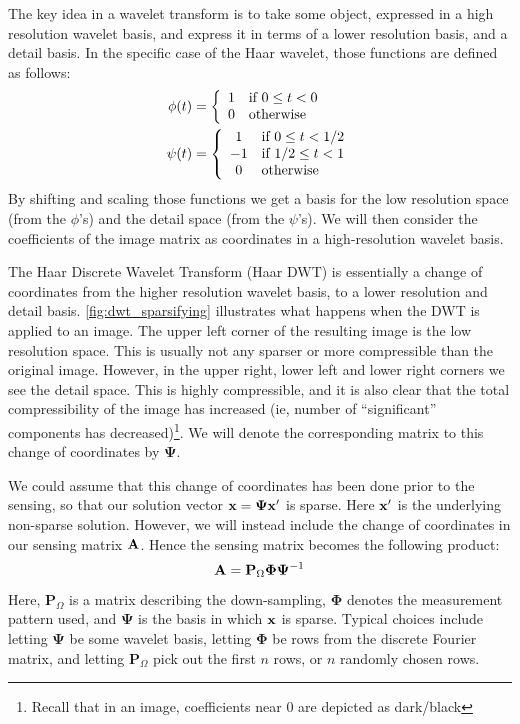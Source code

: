 The key idea in a wavelet transform is to take some object, expressed in a high resolution wavelet basis, and express it in terms of a lower resolution basis, and a detail basis. In the specific case of the Haar wavelet, those functions are defined as follows:
\begin{align*}
	\phi(t) &= \left\{ \begin{array}{cl} 1 & \text{if } 0\leq t < 0 \\ 0 & \text{otherwise} \end{array} \right. \\
	\psi(t) &= \left\{ \begin{array}{cl} 1 & \text{if } 0\leq t < 1/2 \\ -1 & \text{if } 1/2 \leq t < 1 \\ 0 & \text{otherwise} \end{array} \right.
\end{align*}
By shifting and scaling those functions we get a basis for the low resolution space (from the $ \phi $'s) and the detail space (from the $ \psi $'s). We will then consider the coefficients of the image matrix as coordinates in a high-resolution wavelet basis. 

The Haar Discrete Wavelet Transform (Haar DWT) is essentially a change of coordinates from the higher resolution wavelet basis, to a lower resolution and detail basis. \cref{fig:dwt_sparsifying} illustrates what happens when the DWT is applied to an image. The upper left corner of the resulting image is the low resolution space. This is usually not any sparser or more compressible than the original image. However, in the upper right, lower left and lower right corners we see the detail space. This is highly compressible, and it is also clear that the total compressibility of the image has increased (ie, number of ``significant'' components has decreased)\footnote{Recall that in an image, coefficients near $ 0 $ are depicted as dark/black}. We will denote the corresponding matrix to this change of coordinates by $ \mathbf{\Psi} $. 



We could assume that this change of coordinates has been done prior to the sensing, so that our solution vector $ \mathbf{x} = \mathbf{\Psi}\mathbf{x}' $ is sparse. Here $ \mathbf{x}' $ is the underlying non-sparse solution. However, we will instead include the change of coordinates in our sensing matrix $ \mathbf{A} $. Hence the sensing matrix becomes the following product:
\begin{equation}
	\label{eq:sensingmatrix_composition}
	\mathbf{A} = \mathbf{P}_{\Omega}\mathbf{\Phi}\mathbf{\Psi}^{-1}
\end{equation}
Here, $ \mathbf{P}_{\Omega} $ is a matrix describing the down-sampling, $ \mathbf{\Phi} $ denotes the measurement pattern used, and $ \mathbf{\Psi} $ is the basis in which $ \mathbf{x} $ is sparse. Typical choices include letting $ \mathbf{\Psi} $ be some wavelet basis, letting $ \mathbf{\Phi} $ be rows from the discrete Fourier matrix, and letting $ \mathbf{P}_{\Omega} $ pick out the first $ n $ rows, or $ n $ randomly chosen rows. 

